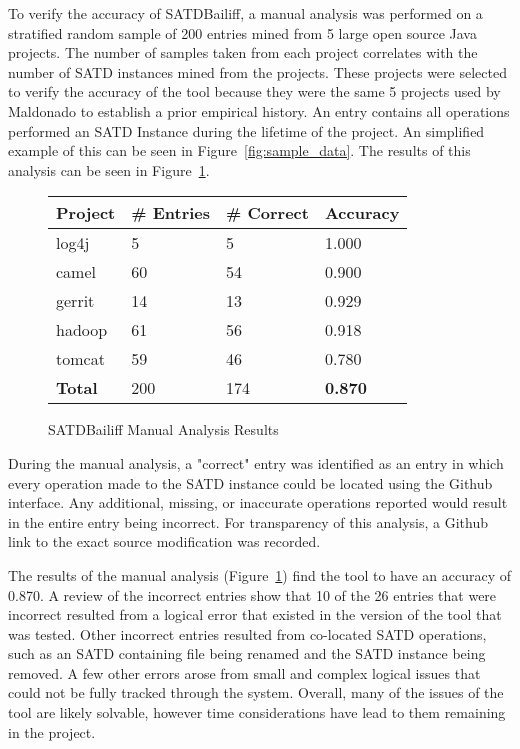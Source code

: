 \documentclass[conference]{IEEEtran}
\begin{document}
To verify the accuracy of SATDBailiff, a manual analysis was performed on a stratified random sample of 200 entries mined from 5 large open source Java projects. The number of samples taken from each project correlates with the number of SATD instances mined from the projects. These projects were selected to verify the accuracy of the tool because they were the same 5 projects used by Maldonado to establish a prior empirical history. An entry contains all operations performed an SATD Instance during the lifetime of the project. An simplified example of this can be seen in Figure~\ref{fig:sample_data}. The results of this analysis can be seen in Figure~\ref{fig:manual_analysis}. 

\begin{figure}
    \centering
    \begin{tabular}{ |p{4.4em}|p{4.6em}|p{4.5em}|p{4.8em}|   }
     \hline
     \textbf{Project} & \textbf{\# Entries} & \textbf{\# Correct} & \textbf{Accuracy}\\
     \hline
     log4j          & 5   & 5   & 1.000\\
     camel          & 60  & 54  & 0.900\\ 
     gerrit         & 14  & 13  & 0.929\\
     hadoop         & 61  & 56  & 0.918\\ 
     tomcat         & 59  & 46  & 0.780\\
     \hline
     \textbf{Total} & 200 & 174 & \textbf{0.870}\\ 
    
     \hline
    \end{tabular}
    \caption{SATDBailiff Manual Analysis Results}
    \label{fig:manual_analysis}
\end{figure}

During the manual analysis, a "correct" entry was identified as an entry in which every operation made to the SATD instance could be located using the Github interface. Any additional, missing, or inaccurate operations reported would result in the entire entry being incorrect. For transparency of this analysis, a Github link to the exact source modification was recorded.

The results of the manual analysis (Figure~\ref{fig:manual_analysis}) find the tool to have an accuracy of 0.870. A review of the incorrect entries show that 10 of the 26 entries that were incorrect resulted from a logical error that existed in the version of the tool that was tested. Other incorrect entries resulted from co-located SATD operations, such as an SATD containing file being renamed and the SATD instance being removed. A few other errors arose from small and complex logical issues that could not be fully tracked through the system. Overall, many of the issues of the tool are likely solvable, however time considerations have lead to them remaining in the project.
\end{document}
